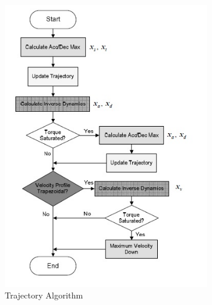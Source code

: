 \begin{figure}[htbp] %
 \centering
   \includegraphics[width=9cm]{images/AlgoFlowchart.jpg}
   \caption[Trajectory Algorithm]
   {Trajectory Algorithm \footnotemark[\value{footnote}]}
   
\label{fig:img1}
\end{figure}

